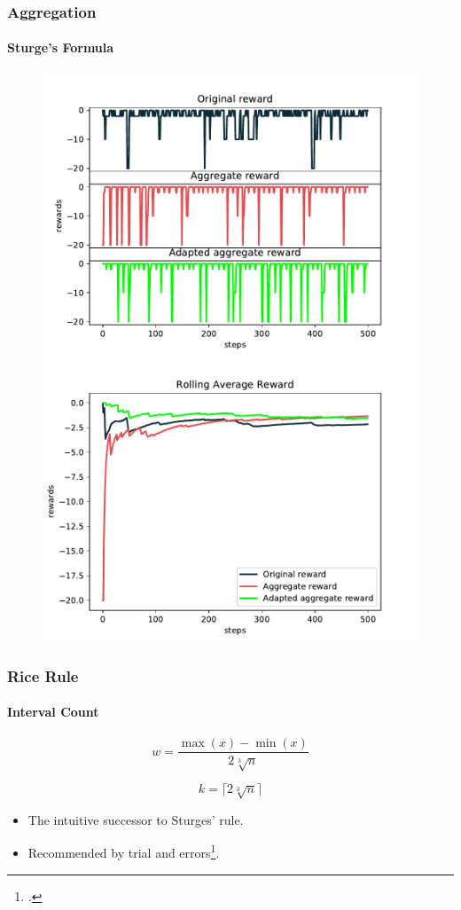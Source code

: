 \documentclass[mathserif]{beamer}
\begin{document}
    \begin{frame}
        \frametitle{Aggregation}
        \framesubtitle{Sturge's Formula}

        \begin{figure}
            \label{fig:sturge-rewards}
            \centering
            \includegraphics[width=0.46\columnwidth]{res/experiments/sturge_steps_rewards.pdf}
            \qquad
            \includegraphics[width=0.46\columnwidth]{res/experiments/sturge_rolling_rewards.pdf}
        \end{figure}

    \end{frame}


    \begin{frame}
        \frametitle{Rice Rule}
        \framesubtitle{Interval Count}

        \begin{equation}
            \label{eq:rice_method_width}
            w = \frac{\max(x) - \min(x)}{2 \sqrt[3]{n}}
        \end{equation}

        \begin{equation}
            \label{eq:rice_method_count}
            k = \lceil 2 \sqrt[3]{n} \rceil
        \end{equation}

        \begin{itemize}
            \item The intuitive successor to Sturges' rule.
            \item Recommended by trial and errors\footcite{Lane2003}.
        \end{itemize}
    \end{frame}
\end{document}
